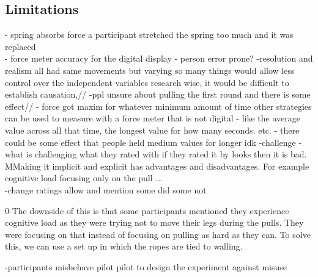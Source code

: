 \subsection{Limitations}
- spring absorbs force a participant stretched the spring too much and it was replaced\\
- force meter accuracy for the digital display
- person error prone?
-resolution and realism all had same movements but varying so many things would allow less control over the independent variables research wise, it would be difficult to establish causation,//
-ppl unsure about pulling the first round and there is some effect//
- force got maxim for whatever minimum amount of time other strategies can be used to measure with a force meter that is not digital - like the average value across all that time, the longest value for how many seconds. etc.
- there could be some effect that people held medium values for longer idk
-challenge - what is challenging what they rated with if they rated it by looks then it is bad. MMaking it implicit and explicit has advantages and disadvantages. For example cognitive load focusing only on the pull ...\\
-change ratings allow and mention some did some not

0-The downside of this is that some participants mentioned they experience cognitive load as they were trying not to move their legs during the pulls. They were focusing on that instead of focusing on pulling as hard as they can. To solve this, we can use a set up in which the ropes are tied to walling.

-participants misbehave pilot pilot to design the experiment against misuse
